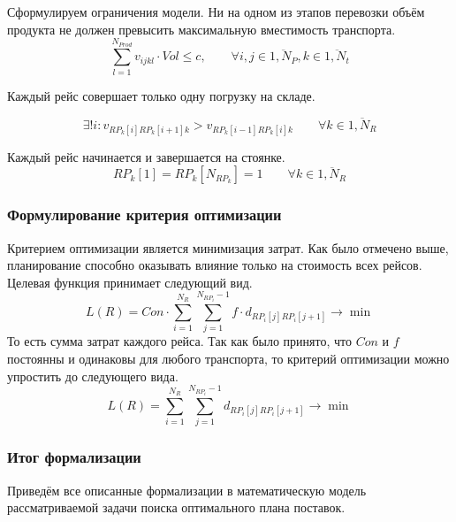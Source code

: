	Сформулируем ограничения модели. Ни на одном из этапов перевозки объём продукта не должен превысить максимальную вместимость транспорта.
	\begin{equation}
		\sum_{l=1}^{N_{Prod}} v_{ijkl} \cdot Vol \le c, \qquad \forall i, j \in \overline{1, N_P}, k \in \overline{1, N_t}
	\end{equation}

	Каждый рейс совершает только одну погрузку на складе. 
	
	\begin{equation}
		\exists! i: v_{RP_k[i]RP_k[i+1]k} > v_{RP_k[i-1]RP_k[i]k} \qquad \forall k \in \overline{1, N_R}
	\end{equation}

	Каждый рейс начинается и завершается на стоянке.
	\begin{equation}
		RP_k[1] = RP_k[N_{RP_k}] = 1 \qquad \forall k \in \overline{1, N_R}
	\end{equation}	
	
	\subsubsection{Формулирование критерия оптимизации}   
	Критерием оптимизации является минимизация затрат. Как было отмечено выше, планирование способно оказывать влияние только на стоимость всех рейсов. Целевая функция принимает следующий вид.
	\begin{equation}
		L(R) = Con \cdot \sum_{i=1}^{N_R} \sum_{j=1}^{N_{RP_i} - 1} f \cdot d_{RP_i[j] RP_i[j+1]} \to \min
	\end{equation}
	То есть сумма затрат каждого рейса. Так как было принято, что $Con$ и $f$ постоянны и одинаковы для любого транспорта, то критерий оптимизации можно упростить до следующего вида.
	\begin{equation}
		L(R) = \sum_{i=1}^{N_R} \sum_{j=1}^{N_{RP_i} - 1} d_{RP_i[j] RP_i[j+1]} \to \min
	\end{equation}

	\subsubsection*{Итог формализации}
	Приведём все описанные формализации в математическую модель рассматриваемой задачи поиска оптимального плана поставок.

